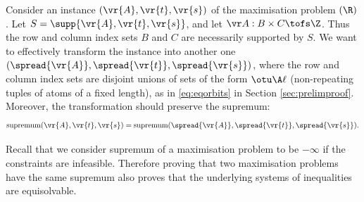Consider an instance $(\vr{A},\vr{t},\vr{s})$ of the maximisation problem \finineqmaxname$(\R)$.
Let $S = \supp{\vr{A},\vr{t},\vr{s}}$, and let
$\vr A : B\times C\tofs \Z$.
Thus the row and column index sets $B$ and $C$ are necessarily supported by $S$.
We want to effectively transform the instance into another one $(\spread{\vr{A}},\spread{\vr{t}},\spread{\vr{s}})$, 
where the row and column index sets are 
disjoint unions of sets of the form $\otu \A \ell$ (non-repeating tuples of atoms of a fixed length), as in
\eqref{eq:eqorbits} in Section \ref{sec:prelimproof}.
%
Moreover, the transformation should preserve the supremum:
\begin{align} \label{eq:supsupprove}
\text{supremum}(\vr{A},\vr{t},\vr{s}) =
\text{supremum}(\spread{\vr{A}},\spread{\vr{t}},\spread{\vr{s}}).
\end{align}

Recall that we consider supremum of a maximisation problem to be $-\infty$ if the constraints are infeasible.
Therefore proving that two maximisation problems have the same supremum also proves that the underlying systems of inequalities are equisolvable.


%
%

